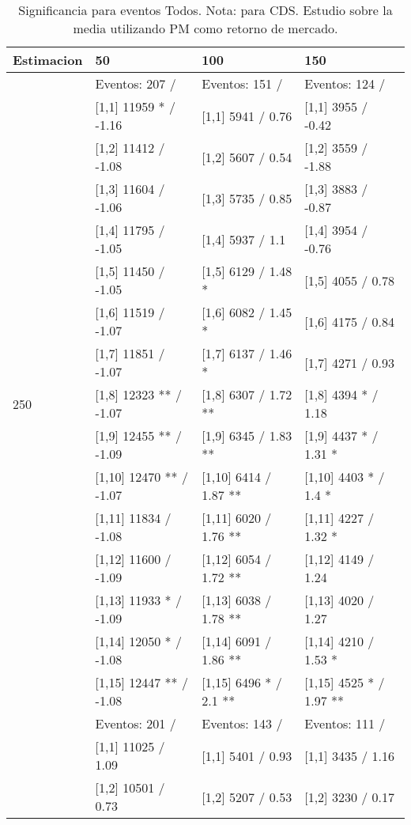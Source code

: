 \begin{table}

\caption{Significancia para eventos Todos. Nota: para CDS. Estudio sobre la media utilizando PM como retorno de mercado.}
\centering
\begin{tabular}[t]{llll}
\toprule
Estimacion & 50 & 100 & 150\\
\midrule
 & Eventos:  207 / & Eventos:  151 / & Eventos:  124 /\\
 & {}[1,1] 11959 * / -1.16 & {}[1,1] 5941  / 0.76 & {}[1,1] 3955  / -0.42\\
 & {}[1,2] 11412  / -1.08 & {}[1,2] 5607  / 0.54 & {}[1,2] 3559  / -1.88\\
 & {}[1,3] 11604  / -1.06 & {}[1,3] 5735  / 0.85 & {}[1,3] 3883  / -0.87\\
 & {}[1,4] 11795  / -1.05 & {}[1,4] 5937  / 1.1 & {}[1,4] 3954  / -0.76\\
\addlinespace
 & {}[1,5] 11450  / -1.05 & {}[1,5] 6129  / 1.48 * & {}[1,5] 4055  / 0.78\\
 & {}[1,6] 11519  / -1.07 & {}[1,6] 6082  / 1.45 * & {}[1,6] 4175  / 0.84\\
 & {}[1,7] 11851  / -1.07 & {}[1,7] 6137  / 1.46 * & {}[1,7] 4271  / 0.93\\
250 & {}[1,8] 12323 ** / -1.07 & {}[1,8] 6307  / 1.72 ** & {}[1,8] 4394 * / 1.18\\
 & {}[1,9] 12455 ** / -1.09 & {}[1,9] 6345  / 1.83 ** & {}[1,9] 4437 * / 1.31 *\\
\addlinespace
 & {}[1,10] 12470 ** / -1.07 & {}[1,10] 6414  / 1.87 ** & {}[1,10] 4403 * / 1.4 *\\
 & {}[1,11] 11834  / -1.08 & {}[1,11] 6020  / 1.76 ** & {}[1,11] 4227  / 1.32 *\\
 & {}[1,12] 11600  / -1.09 & {}[1,12] 6054  / 1.72 ** & {}[1,12] 4149  / 1.24\\
 & {}[1,13] 11933 * / -1.09 & {}[1,13] 6038  / 1.78 ** & {}[1,13] 4020  / 1.27\\
 & {}[1,14] 12050 * / -1.08 & {}[1,14] 6091  / 1.86 ** & {}[1,14] 4210  / 1.53 *\\
\addlinespace
 & {}[1,15] 12447 ** / -1.08 & {}[1,15] 6496 * / 2.1 ** & {}[1,15] 4525 * / 1.97 **\\
 & Eventos:  201 / & Eventos:  143 / & Eventos:  111 /\\
 & {}[1,1] 11025  / 1.09 & {}[1,1] 5401  / 0.93 & {}[1,1] 3435  / 1.16\\
 & {}[1,2] 10501  / 0.73 & {}[1,2] 5207  / 0.53 & {}[1,2] 3230  / 0.17\\

\end{tabular}
\end{table}
